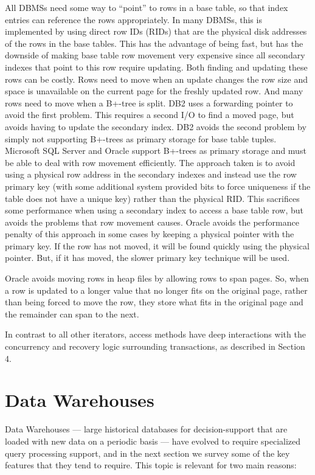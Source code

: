 \documentclass[b5paper,11pt,twoside,openright]{book}
\begin{document}
All DBMSs need some way to ``point'' to rows in a base table, so that
index entries can reference the rows appropriately. In many DBMSs, this
is implemented by using direct row IDs (RIDs) that are the physical disk
addresses of the rows in the base tables. This has the advantage of
being fast, but has the downside of making base table row movement very
expensive since all secondary indexes that point to this row require
updating. Both finding and updating these rows can be costly. Rows need
to move when an update changes the row size and space is unavailable on
the current page for the freshly updated row. And many rows need to move
when a B+-tree is split. DB2 uses a forwarding pointer to avoid the
first problem. This requires a second I/O to find a moved page, but
avoids having to update the secondary index. DB2 avoids the second
problem by simply not supporting B+-trees as primary storage for base
table tuples. Microsoft SQL Server and Oracle support B+-trees as
primary storage and must be able to deal with row movement efficiently.
The approach taken is to avoid using a physical row address in the
secondary indexes and instead use the row primary key (with some
additional system provided bits to force uniqueness if the table does
not have a unique key) rather than the physical RID. This sacrifices
some performance when using a secondary index to access a base table
row, but avoids the problems that row movement causes. Oracle avoids the
performance penalty of this approach in some cases by keeping a physical
pointer with the primary key. If the row has not moved, it will be found
quickly using the physical pointer. But, if it has moved, the slower
primary key technique will be used.

Oracle avoids moving rows in heap files by allowing rows to span pages.
So, when a row is updated to a longer value that no longer fits on the
original page, rather than being forced to move the row, they store what
fits in the original page and the remainder can span to the next.

In contrast to all other iterators, access methods have deep
interactions with the concurrency and recovery logic surrounding
transactions, as described in Section 4.

\hypertarget{data-warehouses}{%
\section{Data Warehouses}\label{data-warehouses}}

Data Warehouses --- large historical databases for decision-support that
are loaded with new data on a periodic basis --- have evolved to require
specialized query processing support, and in the next section we survey
some of the key features that they tend to require. This topic is
relevant for two main reasons:
\end{document}
